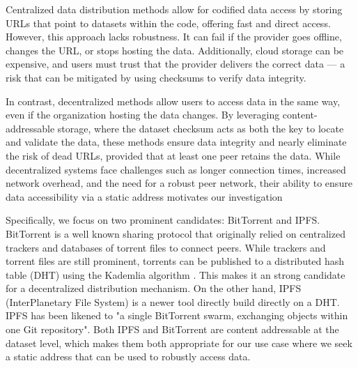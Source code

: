 \documentclass[10pt,twocolumn,letterpaper]{article}
\begin{document}
Centralized data distribution methods allow for codified data access by storing URLs that point to datasets
  within the code, offering fast and direct access.
However, this approach lacks robustness.
It can fail if the provider goes offline, changes the URL, or stops hosting the data.
Additionally, cloud storage can be expensive, and users must trust that the provider delivers the correct
  data --- a risk that can be mitigated by using checksums to verify data integrity.

In contrast, decentralized methods allow users to access data in the same way, even if the organization
  hosting the data changes.
By leveraging content-addressable storage, where the dataset checksum acts as both the key to locate and
  validate the data, these methods ensure data integrity and nearly eliminate the risk of dead URLs, provided
  that at least one peer retains the data.
While decentralized systems face challenges such as longer connection times, increased network overhead, and
  the need for a robust peer network, their ability to ensure data accessibility via a static address
  motivates our investigation

Specifically, we focus on two prominent candidates:
BitTorrent and IPFS.
BitTorrent \cite{cohen_incentives_2003, cohen_bittorrent_2017} is a well known sharing protocol that
  originally relied on centralized trackers and databases of torrent files to connect peers.
While trackers and torrent files are still prominent, torrents can be published to a distributed hash table
  (DHT) using the Kademlia algorithm \cite{maymounkov_kademlia_2002}.
This makes it an strong candidate for a decentralized distribution mechanism.
On the other hand, IPFS (InterPlanetary File System) \cite{benet_ipfs_2014, bieri_overview_2021} is a newer
  tool directly build directly on a DHT.
IPFS has been likened to "a single BitTorrent swarm, exchanging objects within one Git repository".
Both IPFS and BitTorrent are content addressable at the dataset level, which makes them both appropriate for
  our use case where we seek a static address that can be used to robustly access data.
\end{document}
